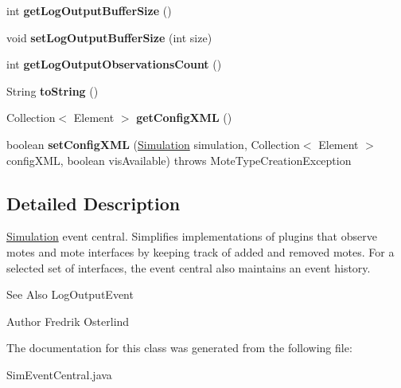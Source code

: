 \begin{DoxyCompactItemize}
\item 
\hypertarget{classorg_1_1contikios_1_1cooja_1_1SimEventCentral_a07f39e7030428b5a47c9e2bcfb60ba2a}{int {\bfseries get\-Log\-Output\-Buffer\-Size} ()}\label{classorg_1_1contikios_1_1cooja_1_1SimEventCentral_a07f39e7030428b5a47c9e2bcfb60ba2a}

\item 
\hypertarget{classorg_1_1contikios_1_1cooja_1_1SimEventCentral_a29a6217a9317db2328d414d31b7c149a}{void {\bfseries set\-Log\-Output\-Buffer\-Size} (int size)}\label{classorg_1_1contikios_1_1cooja_1_1SimEventCentral_a29a6217a9317db2328d414d31b7c149a}

\item 
\hypertarget{classorg_1_1contikios_1_1cooja_1_1SimEventCentral_af14b6324717c16b1dfd93463f4aeee31}{int {\bfseries get\-Log\-Output\-Observations\-Count} ()}\label{classorg_1_1contikios_1_1cooja_1_1SimEventCentral_af14b6324717c16b1dfd93463f4aeee31}

\item 
\hypertarget{classorg_1_1contikios_1_1cooja_1_1SimEventCentral_aac17a82fdfd32772827ee4e78ca6197d}{String {\bfseries to\-String} ()}\label{classorg_1_1contikios_1_1cooja_1_1SimEventCentral_aac17a82fdfd32772827ee4e78ca6197d}

\item 
\hypertarget{classorg_1_1contikios_1_1cooja_1_1SimEventCentral_a8f696c19dc950e97da932608e0976388}{Collection$<$ Element $>$ {\bfseries get\-Config\-X\-M\-L} ()}\label{classorg_1_1contikios_1_1cooja_1_1SimEventCentral_a8f696c19dc950e97da932608e0976388}

\item 
\hypertarget{classorg_1_1contikios_1_1cooja_1_1SimEventCentral_ad34fbe0521ba5def51c3713ae1bab5ff}{boolean {\bfseries set\-Config\-X\-M\-L} (\hyperlink{classorg_1_1contikios_1_1cooja_1_1Simulation}{Simulation} simulation, Collection$<$ Element $>$ config\-X\-M\-L, boolean vis\-Available)  throws Mote\-Type\-Creation\-Exception }\label{classorg_1_1contikios_1_1cooja_1_1SimEventCentral_ad34fbe0521ba5def51c3713ae1bab5ff}

\end{DoxyCompactItemize}


\subsection{Detailed Description}
\hyperlink{classorg_1_1contikios_1_1cooja_1_1Simulation}{Simulation} event central. Simplifies implementations of plugins that observe motes and mote interfaces by keeping track of added and removed motes. For a selected set of interfaces, the event central also maintains an event history.

\begin{DoxySeeAlso}{See Also}
Log\-Output\-Event 
\end{DoxySeeAlso}
\begin{DoxyAuthor}{Author}
Fredrik Osterlind 
\end{DoxyAuthor}


The documentation for this class was generated from the following file\-:\begin{DoxyCompactItemize}
\item 
Sim\-Event\-Central.\-java\end{DoxyCompactItemize}
